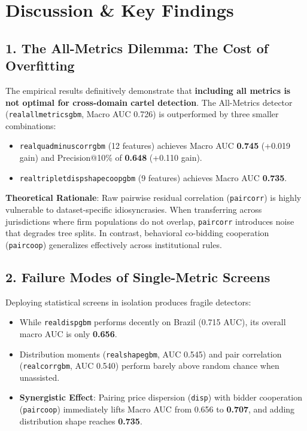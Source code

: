 \documentclass[11pt,a4paper]{article}
\renewcommand{\_}{\textunderscore\allowbreak}
\begin{document}
\section{Discussion \& Key Findings}

\subsection{1. The All-Metrics Dilemma: The Cost of Overfitting}
The empirical results definitively demonstrate that \textbf{including all metrics is not optimal for cross-domain cartel detection}. The All-Metrics detector (\texttt{real\_all\_metrics\_gbm}, Macro AUC 0.726) is outperformed by three smaller combinations:
\begin{itemize}[noitemsep]
    \item \texttt{real\_quad\_minus\_corr\_gbm} (12 features) achieves Macro AUC \textbf{0.745} (+0.019 gain) and Precision@10\% of \textbf{0.648} (+0.110 gain).
    \item \texttt{real\_triplet\_disp\_shape\_coop\_gbm} (9 features) achieves Macro AUC \textbf{0.735}.
\end{itemize}
\textbf{Theoretical Rationale}: Raw pairwise residual correlation (\texttt{pair\_corr}) is highly vulnerable to dataset-specific idiosyncrasies. When transferring across jurisdictions where firm populations do not overlap, \texttt{pair\_corr} introduces noise that degrades tree splits. In contrast, behavioral co-bidding cooperation (\texttt{pair\_coop}) generalizes effectively across institutional rules.

\subsection{2. Failure Modes of Single-Metric Screens}
Deploying statistical screens in isolation produces fragile detectors:
\begin{itemize}[noitemsep]
    \item While \texttt{real\_disp\_gbm} performs decently on Brazil (0.715 AUC), its overall macro AUC is only \textbf{0.656}.
    \item Distribution moments (\texttt{real\_shape\_gbm}, AUC 0.545) and pair correlation (\texttt{real\_corr\_gbm}, AUC 0.540) perform barely above random chance when unassisted.
    \item \textbf{Synergistic Effect}: Pairing price dispersion (\texttt{disp}) with bidder cooperation (\texttt{pair\_coop}) immediately lifts Macro AUC from 0.656 to \textbf{0.707}, and adding distribution shape reaches \textbf{0.735}.
\end{itemize}
\end{document}
